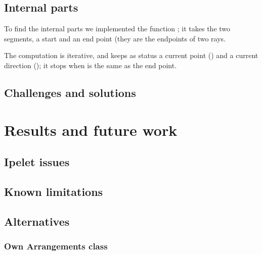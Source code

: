 \documentclass[11pt,a4paper,english]{article}
\begin{document}
	\subsection{Internal parts}
	To find the internal parts we implemented the function ; it takes the two segments, a start and an end point (they are the endpoints of two rays.\par
	The computation is iterative, and keeps as status a current point () and a current direction (); it stops when  is the same as the end point.
	
	\subsection{Challenges and solutions}
	
	
	\section{Results and future work}
	
	\subsection{Ipelet issues}
	
	\subsection{Known limitations}
	
	\subsection{Alternatives}
	
	\subsubsection{}
	
	\subsubsection{Own Arrangements class}
	
\end{document}
